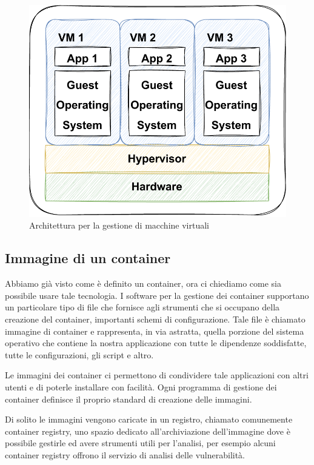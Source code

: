 \begin{figure}[h]
    \centering
    \includegraphics[scale=0.65]{capitoli/immagini/06_virtual_machine_architecture.pdf}
    \caption{Architettura per la gestione di macchine virtuali}
    \label{fig:vm_architecture}
\end{figure}

\subsection{Immagine di un container}
Abbiamo già visto come è definito un container, ora ci chiediamo come sia possibile usare tale tecnologia. I software per la gestione dei container supportano un particolare tipo di file che fornisce agli strumenti che si occupano della creazione del container, importanti schemi di configurazione. Tale file è chiamato immagine di container e rappresenta, in via astratta, quella porzione del sistema operativo che contiene la nostra applicazione con tutte le dipendenze soddisfatte, tutte le configurazioni, gli script e altro.

Le immagini dei container ci permettono di condividere tale applicazioni con altri utenti e di poterle installare con facilità. Ogni programma di gestione dei container definisce il proprio standard di creazione delle immagini.

Di solito le immagini vengono caricate in un  registro, chiamato comunemente container registry, uno spazio dedicato all'archiviazione dell'immagine dove è possibile gestirle ed avere strumenti utili per l'analisi, per esempio alcuni container registry offrono il servizio di analisi delle vulnerabilità.

